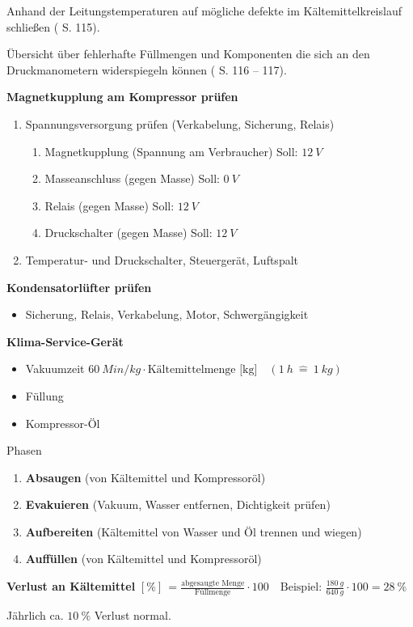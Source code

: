 Anhand der Leitungstemperaturen auf mögliche defekte im
Kältemittelkreislauf schließen (\textcite{schmidt:2015:klima} S. 115).

Übersicht über fehlerhafte Füllmengen und Komponenten die sich an den
Druckmanometern widerspiegeln können (\textcite{schmidt:2015:klima} S. 116
-- 117).

\textbf{Magnetkupplung am Kompressor prüfen}

\begin{enumerate}
\item
  Spannungsversorgung prüfen (Verkabelung, Sicherung, Relais)

  \begin{enumerate}
  \def\labelenumii{\arabic{enumii}.}
  \item
    Magnetkupplung (Spannung am Verbraucher) Soll: $12~V$
  \item
    Masseanschluss (gegen Masse) Soll: $0~V$
  \item
    Relais (gegen Masse) Soll: $12~V$
  \item
    Druckschalter (gegen Masse) Soll: $12~V$
  \end{enumerate}
\item
  Temperatur- und Druckschalter, Steuergerät, Luftspalt
\end{enumerate}

\textbf{Kondensatorlüfter prüfen}

\begin{itemize}
\item
  Sicherung, Relais, Verkabelung, Motor, Schwergängigkeit
\end{itemize}

\textbf{Klima-Service-Gerät}

\begin{itemize}
\item
  Vakuumzeit
  $\boxed{60~Min/kg \cdot \text{Kältemittelmenge [kg]}} \quad (1~h~\hat =~ 1~kg)$
\item
  Füllung
\item
  Kompressor-Öl
\end{itemize}

Phasen

\begin{enumerate}
\item
  \textbf{Absaugen} (von Kältemittel und Kompressoröl)
\item
  \textbf{Evakuieren} (Vakuum, Wasser entfernen, Dichtigkeit prüfen)
\item
  \textbf{Aufbereiten} (Kältemittel von Wasser und Öl trennen und
  wiegen)
\item
  \textbf{Auffüllen} (von Kältemittel und Kompressoröl)
\end{enumerate}

\textbf{Verlust an Kältemittel}
$[\%] \, \boxed{= \frac{\text{abgesaugte Menge}}{\text{Füllmenge}} \cdot 100} \quad \text{Beispiel: } \frac{180~g}{640~g} \cdot 100 = 28~\%$

Jährlich ca. $10~\%$ Verlust normal.
